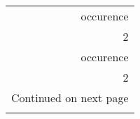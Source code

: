 \begin{longtable}{r}
\toprule
 occurence \\
         2 \\
\midrule
\endfirsthead

\toprule
 occurence \\
         2 \\
\midrule
\endhead
\midrule
\multicolumn{1}{r}{{Continued on next page}} \\
\midrule
\endfoot

\bottomrule
\endlastfoot
        15 \\
\end{longtable}
